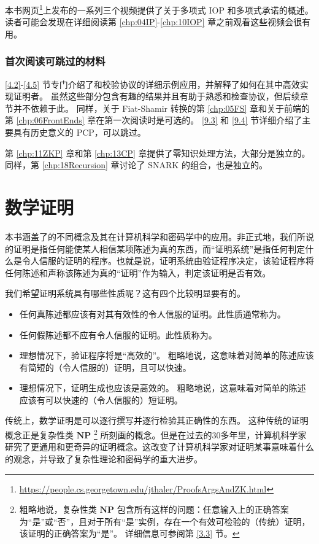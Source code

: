 本书网页\footnote{\url{https://people.cs.georgetown.edu/jthaler/ProofsArgsAndZK.html}}上发布的一系列三个视频提供了关于多项式 IOP 和多项式承诺的概述。 读者可能会发现在详细阅读第 \ref{chp:04IP}-\ref{chp:10IOP} 章之前观看这些视频会很有用。


\subsubsection{首次阅读可跳过的材料} 
\ref{4.2}-\ref{4.5} 节专门介绍了和校验协议的详细示例应用，并解释了如何在其中高效实现证明者。 虽然这些部分包含有趣的结果并且有助于熟悉和检查协议，但后续章节并不依赖于此。 同样，关于 Fiat-Shamir 转换的第 \ref{chp:05FS} 章和关于前端的第 \ref{chp:06FrontEnds} 章在第一次阅读时是可选的。 \ref{9.3} 和 \ref{9.4} 节详细介绍了主要具有历史意义的 PCP，可以跳过。

第 \ref{chp:11ZKP} 章和第 \ref{chp:13CP} 章提供了零知识处理方法，大部分是独立的。 同样，第 \ref{chp:18Recursion} 章讨论了 SNARK 的组合，也是独立的。



\section{数学证明}
本书涵盖了的不同概念及其在计算机科学和密码学中的应用。非正式地，我们所说的证明是指任何能使某人相信某项陈述为真的东西，而“证明系统”是指任何判定什么是令人信服的证明的程序。也就是说，证明系统由验证程序决定，该验证程序将任何陈述和声称该陈述为真的“证明”作为输入，判定该证明是否有效。

我们希望证明系统具有哪些性质呢？这有四个比较明显要有的。
\begin{itemize}
    \item 任何真陈述都应该有对其有效性的令人信服的证明。此性质通常称为。
    \item 任何假陈述都不应有令人信服的证明。此性质称为。
    \item 理想情况下，验证程序将是“高效的”。 粗略地说，这意味着对简单的陈述应该有简短的（令人信服的）证明，且可以快速。
    \item 理想情况下，证明生成也应该是高效的。 粗略地说，这意味着对简单的陈述应该有可以快速的（令人信服的）短证明。
\end{itemize}


传统上，数学证明是可以逐行撰写并逐行检验其正确性的东西。 这种传统的证明概念正是复杂性类 $\mathbf{N P}$ \footnote{粗略地说，复杂性类 $\mathbf{N P}$ 包含所有这样的问题：任意输入上的正确答案为“是”或“否”，且对于所有“是”实例，存在一个有效可检验的（传统）证明，该证明的正确答案为“是”。 详细信息可参阅第 \ref{3.3} 节。} 所刻画的概念。但是在过去的30多年里，计算机科学家研究了更通用和更奇异的证明概念。这改变了计算机科学家对证明某事意味着什么的观念，并导致了复杂性理论和密码学的重大进步。


